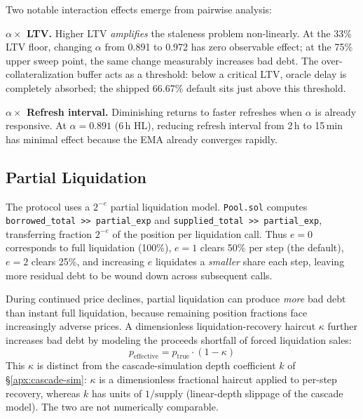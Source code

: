 \documentclass[10pt,a4paper,twocolumn]{article}
\begin{document}
Two notable interaction effects emerge from pairwise analysis:

\textbf{$\alpha \times$ LTV.} Higher LTV \emph{amplifies} the staleness problem non-linearly. At the 33\% LTV floor, changing $\alpha$ from 0.891 to 0.972 has zero observable effect; at the 75\% upper sweep point, the same change measurably increases bad debt. The over-collateralization buffer acts as a threshold: below a critical LTV, oracle delay is completely absorbed; the shipped 66.67\% default sits just above this threshold.

\textbf{$\alpha \times$ Refresh interval.} Diminishing returns to faster refreshes when $\alpha$ is already responsive. At $\alpha = 0.891$ (6\,h HL), reducing refresh interval from 2\,h to 15\,min has minimal effect because the EMA already converges rapidly.

\subsection{Partial Liquidation}
\label{sec:bd-partial-liq}

The protocol uses a $2^{-e}$ partial liquidation model. \texttt{Pool.sol} computes \texttt{borrowed\_total >> partial\_exp} and \texttt{supplied\_total >> partial\_exp}, transferring fraction $2^{-e}$ of the position per liquidation call. Thus $e = 0$ corresponds to full liquidation (100\%), $e = 1$ clears 50\% per step (the default), $e = 2$ clears 25\%, and increasing $e$ liquidates a \emph{smaller} share each step, leaving more residual debt to be wound down across subsequent calls.

During continued price declines, partial liquidation can produce \emph{more} bad debt than instant full liquidation, because remaining position fractions face increasingly adverse prices. A dimensionless liquidation-recovery haircut $\kappa$ further increases bad debt by modeling the proceeds shortfall of forced liquidation sales:
\begin{equation}
p_{\text{effective}} = p_{\text{true}} \cdot (1 - \kappa)
\end{equation}
This $\kappa$ is distinct from the cascade-simulation depth coefficient $k$ of \S\ref{apx:cascade-sim}: $\kappa$ is a dimensionless fractional haircut applied to per-step recovery, whereas $k$ has units of $1/\text{supply}$ (linear-depth slippage of the cascade model). The two are not numerically comparable.
\end{document}
